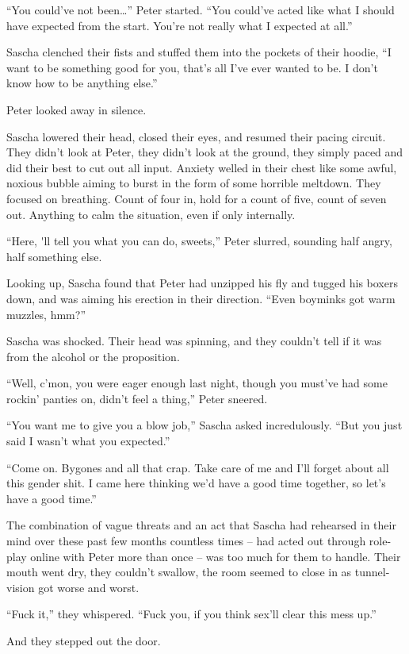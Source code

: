 ``You could've not been\ldots{}'' Peter started. ``You could've acted like what I should have expected from the start. You're not really what I expected at all.''

Sascha clenched their fists and stuffed them into the pockets of their hoodie, ``I want to be something good for you, that's all I've ever wanted to be. I don't know how to be anything else.''

Peter looked away in silence.

Sascha lowered their head, closed their eyes, and resumed their pacing circuit. They didn't look at Peter, they didn't look at the ground, they simply paced and did their best to cut out all input. Anxiety welled in their chest like some awful, noxious bubble aiming to burst in the form of some horrible meltdown. They focused on breathing. Count of four in, hold for a count of five, count of seven out. Anything to calm the situation, even if only internally.

``Here, \'{}ll tell you what you can do, sweets,'' Peter slurred, sounding half angry, half something else.

Looking up, Sascha found that Peter had unzipped his fly and tugged his boxers down, and was aiming his erection in their direction. ``Even boyminks got warm muzzles, hmm?''

Sascha was shocked. Their head was spinning, and they couldn't tell if it was from the alcohol or the proposition.

``Well, c'mon, you were eager enough last night, though you must've had some rockin' panties on, didn't feel a thing,'' Peter sneered.

``You want me to give you a blow job,'' Sascha asked incredulously. ``But you just said I wasn't what you expected.''

``Come on. Bygones and all that crap. Take care of me and I'll forget about all this gender shit. I came here thinking we'd have a good time together, so let's have a good time.''

The combination of vague threats and an act that Sascha had rehearsed in their mind over these past few months countless times -- had acted out through role-play online with Peter more than once -- was too much for them to handle. Their mouth went dry, they couldn't swallow, the room seemed to close in as tunnel-vision got worse and worst.

``Fuck it,'' they whispered. ``Fuck you, if you think sex'll clear this mess up.''

And they stepped out the door.

